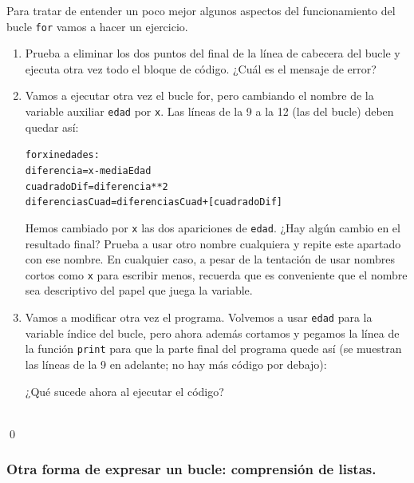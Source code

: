 \documentclass[10pt,a4paper]{article}\usepackage[]{graphicx}\usepackage[]{color}
\makeatletter
\newenvironment{kframe}{%
 \def\at@end@of@kframe{}%
 \ifinner\ifhmode%
  \def\at@end@of@kframe{\end{minipage}}%
  \begin{minipage}{\columnwidth}%
 \fi\fi%
 \def\FrameCommand##1{\hskip\@totalleftmargin \hskip-\fboxsep
 \colorbox{shadecolor}{##1}\hskip-\fboxsep
     \hskip-\linewidth \hskip-\@totalleftmargin \hskip\columnwidth}%
 \MakeFramed {\advance\hsize-\width
   \@totalleftmargin\z@ \linewidth\hsize
   \@setminipage}}%
 {\par\unskip\endMakeFramed%
 \at@end@of@kframe}
\newenvironment{knitrout}{}{} %
\makeatother
\begin{document}
Para tratar de entender un poco mejor algunos aspectos del funcionamiento del bucle {\tt for} vamos a hacer un ejercicio.
\begin{ejercicio}
\label{tut02:ejercicio15}
\quad
\begin{enumerate}
\item Prueba a eliminar los dos puntos del final de la línea de cabecera del bucle y ejecuta otra vez todo el bloque de código. ¿Cuál es el mensaje de error?

\item Vamos a ejecutar otra vez el bucle for, pero cambiando el nombre de la variable auxiliar {\tt edad} por {\tt x}. Las líneas de la 9 a la 12 (las del bucle) deben quedar así:
\begin{knitrout}
\color{fgcolor}\begin{kframe}
\begin{alltt}
for x in edades:
  diferencia = x - mediaEdad
  cuadradoDif = diferencia**2
  diferenciasCuad = diferenciasCuad + [cuadradoDif]
\end{alltt}
\end{kframe}
\end{knitrout}
Hemos cambiado por {\tt x} las dos apariciones de {\tt edad}. ¿Hay algún cambio en el resultado final? Prueba a usar otro nombre cualquiera y repite este apartado con ese nombre. En cualquier caso, a pesar de la tentación de usar nombres cortos como {\tt x} para escribir menos, recuerda que es conveniente que el nombre sea descriptivo del papel que juega la variable.

\item  Vamos a modificar otra vez el programa. Volvemos a usar {\tt edad} para la variable índice del bucle, pero ahora además cortamos y pegamos la línea de la función {\tt print} para que la parte final del programa quede así (se muestran las líneas de la 9 en adelante; no hay más código por debajo):

¿Qué sucede ahora al ejecutar el código? 
\end{enumerate}
\quad\\
\qed
\end{ejercicio}

\subsubsection*{Otra forma de expresar un bucle: comprensión de listas.}
\label{tut02:subsubsec:comprensionListas}
\end{document}
